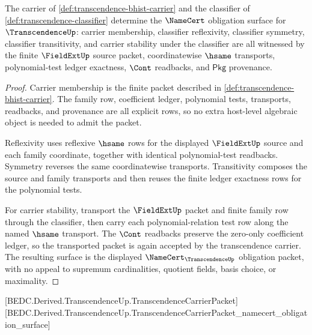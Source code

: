 \begin{theorem}\label{thm:transcendence-namecert-obligation-surface}
The carrier of \autoref{def:transcendence-bhist-carrier} and the classifier of
\autoref{def:transcendence-classifier} determine the $\NameCert$ obligation
surface for $\TranscendenceUp$: carrier membership, classifier reflexivity,
classifier symmetry, classifier transitivity, and carrier stability under the
classifier are all witnessed by the finite $\FieldExtUp$ source packet,
coordinatewise $\hsame$ transports, polynomial-test ledger exactness, $\Cont$
readbacks, and $\mathsf{Pkg}$ provenance.
\end{theorem}
\begin{proof}
Carrier membership is the finite packet described in
\autoref{def:transcendence-bhist-carrier}. The family row, coefficient ledger,
polynomial tests, transports, readbacks, and provenance are all explicit rows,
so no extra host-level algebraic object is needed to admit the packet.

Reflexivity uses reflexive $\hsame$ rows for the displayed $\FieldExtUp$ source
and each family coordinate, together with identical polynomial-test readbacks.
Symmetry reverses the same coordinatewise transports. Transitivity composes the
source and family transports and then reuses the finite ledger exactness rows
for the polynomial tests.

For carrier stability, transport the $\FieldExtUp$ packet and finite family row
through the classifier, then carry each polynomial-relation test row along the
named $\hsame$ transport. The $\Cont$ readbacks preserve the zero-only
coefficient ledger, so the transported packet is again accepted by the
transcendence carrier. The resulting surface is the displayed
$\NameCert_{\TranscendenceUp}$ obligation packet, with no appeal to supremum
cardinalities, quotient fields, basis choice, or maximality.
\end{proof}

[BEDC.Derived.TranscendenceUp.TranscendenceCarrierPacket]
[BEDC.Derived.TranscendenceUp.TranscendenceCarrierPacket\_namecert\_obligation\_surface]

